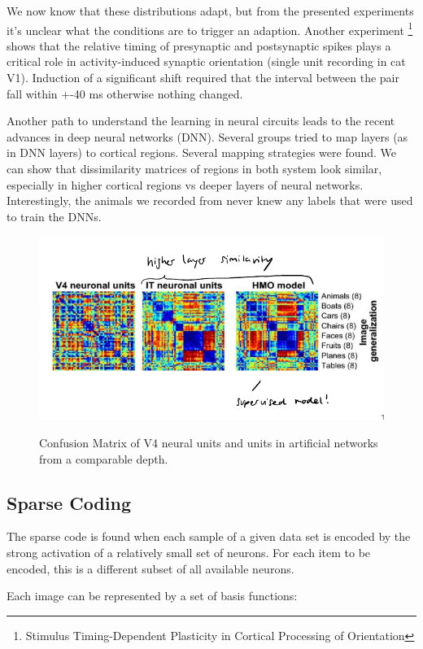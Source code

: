 \documentclass[main]{subfiles}
\begin{document}
We now know that these distributions adapt, but from the presented experiments it's unclear what the conditions are to trigger an adaption. Another experiment \footnote{Stimulus Timing-Dependent Plasticity in Cortical Processing of Orientation} shows that the  relative  timing  of  presynaptic  and  postsynaptic spikes plays a critical role in activity-induced synaptic orientation (single unit recording in cat V1). Induction of a significant shift required that the interval between the pair fall within +-40 ms otherwise nothing changed.

Another path to understand the learning in neural circuits leads to the recent advances in deep neural networks (DNN). Several groups tried to map layers (as in DNN layers) to cortical regions. Several mapping strategies were found. We can show that dissimilarity matrices of regions in both system look similar, especially in higher cortical regions vs deeper layers of neural networks. Interestingly, the animals we recorded from never knew any labels that were used to train the DNNs.

\begin{figure}[H]
	\centering
	\includegraphics[width=0.9\linewidth]{07_UnsupervisedAndSelfsupervisedLearning/figures/conf-matrix.png}
	\label{fig:conf-matrix}
	\caption{Confusion Matrix of V4 neural units and units in artificial networks from a comparable depth.}
\end{figure}


\subsection{Sparse Coding}
The sparse code is found when each sample of a given data set is encoded by the strong activation of a relatively small set of neurons. For each item to be encoded, this is a different subset of all available neurons. 

Each image can be represented by a set of basis functions:
\end{document}
